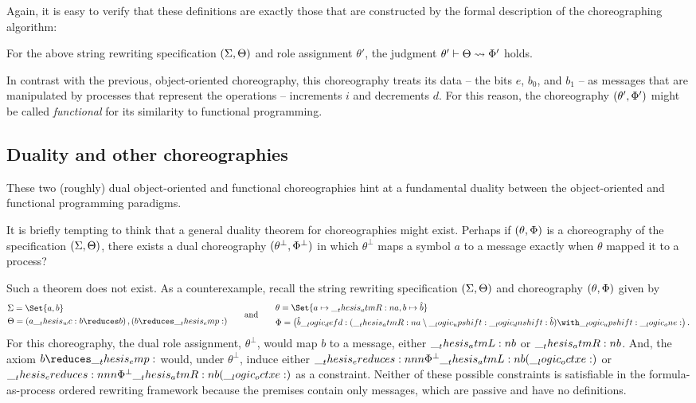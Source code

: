 Again, it is easy to verify that these definitions are exactly those that are constructed by the formal description of the choreographing algorithm:
\begin{proposition}
  For the above string rewriting specification $(\Sigma, \Theta)$ and role assignment $\theta'$, the judgment $\theta' \vdash \Theta \rightsquigarrow \Phi'$ holds.
\end{proposition}

In contrast with the previous, object-oriented choreography, this choreography treats its data -- the bits $e$, $b_0$, and $b_1$ -- as messages that are manipulated by processes that represent the operations -- increments $i$ and decrements $d$.
For this reason, the choreography $(\theta', \Phi')$ might be called \emph{functional} for its similarity to functional programming.

\subsection{Duality and other choreographies}

These two (roughly) dual object-oriented and functional choreographies hint at a fundamental duality between the object-oriented and functional programming paradigms.

It is briefly tempting to think that a general duality theorem for choreographies might exist.
Perhaps if $(\theta, \Phi)$ is a choreography of the specification $(\Sigma, \Theta)$, there exists a dual choreography $(\theta^{\bot}, \Phi^{\bot})$ in which $\theta^{\bot}$ maps a symbol $a$ to a message exactly when $\theta$ mapped it to a process?

Such a theorem does not exist.
As a counterexample, recall the string rewriting specification $(\Sigma, \Theta)$ and choreography $(\theta, \Phi)$ given by
\begin{equation*}
  \begin{lgathered}
    \sralph = \Set{a, b} \\
    \srsig = (a \wc b \reduces b) \,, (b \reduces \emp)
  \end{lgathered}
  \qquad\text{and}\qquad
  \begin{lgathered}
    \theta = \Set{ a \mapsto \atmR{a} , b \mapsto \defp{b} } \\
    \orsig = \bigl(\defp{b} \defd (\atmR{a} \limp \up \dn \defp{b}) \with \up \one\bigr)
    \,.
  \end{lgathered}
\end{equation*}
For this choreography, the dual role assignment, $\theta^{\bot}$, would map $b$ to a message, either $\__thesis_atmL:n {b}$ or $\__thesis_atmR:n {b}$.
And, the axiom $b \reduces \emp$ would, under $\theta^{\bot}$, induce either $\ereduces[\orsig^{\bot}]{\atmL{b}}{(\octxe)}$ or $\ereduces[\orsig^{\bot}]{\atmR{b}}{(\octxe)}$ as a constraint.
Neither of these possible constraints is satisfiable in the formula-as-process ordered rewriting framework because the premises contain only messages, which are passive and have no definitions.

